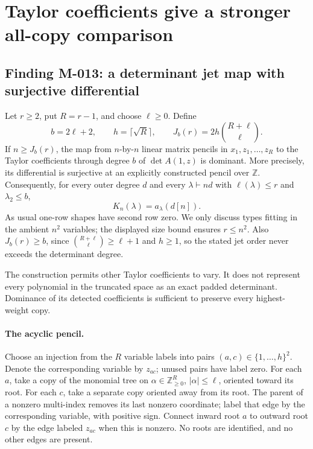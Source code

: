 \section{Taylor coefficients give a stronger all-copy comparison}

\subsection*{Finding M-013: a determinant jet map with surjective differential}
Let \(r\geq2\), put \(R=r-1\), and choose \(\ell\geq0\).
Define
\[
 b=2\ell+2,\qquad h=\lceil\sqrt R\rceil,\qquad
 J_b(r)=2h\binom{R+\ell}{\ell}.
\]
If \(n\geq J_b(r)\), the map from \(n\)-by-\(n\)
linear matrix pencils in \(x_1,z_1,\ldots,z_R\) to the
Taylor coefficients through degree \(b\) of
\(\det A(1,z)\) is dominant. More precisely, its differential
is surjective at an explicitly constructed pencil over \(\mathbb Z\).
Consequently, for every outer degree \(d\) and every
\(\lambda\vdash nd\) with \(\ell(\lambda)\leq r\)
and \(\lambda_2\leq b\),
\begin{equation}\label{eq:M013K}
                         K_n(\lambda)=a_\lambda(d[n]).
\end{equation}
As usual one-row shapes have second row zero. We only discuss
types fitting in the ambient \(n^2\) variables; the displayed
size bound ensures \(r\leq n^2\).
Also \(J_b(r)\geq b\), since
\(\binom{R+\ell}{\ell}\geq\ell+1\) and \(h\geq1\),
so the stated jet order never exceeds the determinant degree.

The construction permits other Taylor coefficients to vary.
It does not represent every polynomial in the truncated space
as an exact padded determinant. Dominance of its detected
coefficients is sufficient to preserve every highest-weight copy.

\paragraph{The acyclic pencil.}
Choose an injection from the \(R\) variable labels into pairs
\((a,c)\in\{1,\ldots,h\}^2\). Denote the corresponding
variable by \(z_{ac}\); unused pairs have label zero.
For each \(a\), take a copy of the monomial tree on
\(\alpha\in\mathbb Z_{\geq0}^R\), \(|\alpha|\leq\ell\),
oriented toward its root. For each \(c\), take a separate
copy oriented away from its root. The parent of a nonzero
multi-index removes its last nonzero coordinate; label that
edge by the corresponding variable, with positive sign.
Connect inward root \(a\) to outward root \(c\) by the
edge labeled \(z_{ac}\) when this is nonzero. No roots
are identified, and no other edges are present.

